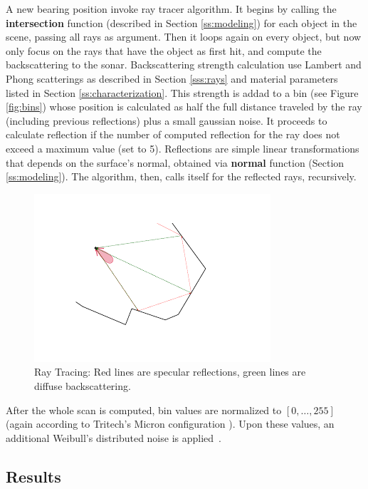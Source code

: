 A new bearing position invoke ray tracer algorithm. It begins by calling
the \textbf{intersection} function (described in Section \ref{ss:modeling}) for
each object in the scene, passing all rays as argument. Then it loops again on every
object, but now only focus on the rays that have the object as first hit, and
compute the backscattering to the sonar. Backscattering strength calculation use
Lambert and Phong scatterings as described in Section \ref{sss:rays} and material
parameters listed in Section \ref{ss:characterization}. This strength is addad
to a bin (see Figure \ref{fig:bins}) whose position is calculated as half the full
distance traveled by the ray (including previous reflections) plus a small
gaussian noise. It proceeds to calculate reflection if the number of computed
reflection for the ray does not exceed a maximum value (set to 5). Reflections
are simple linear transformations that depends on the surface's normal, obtained
via \textbf{normal} function (Section \ref{ss:modeling}). The algorithm, then,
calls itself for the reflected rays, recursively.

\begin{figure}
	\centering
	\includegraphics[scale=2.5, trim={20 20 20 20}, clip]{Chap2/fig/method.pdf}
	\caption{Ray Tracing: Red lines are specular reflections, green lines are diffuse backscattering.}
	\label{fig:methodtrace}
\end{figure}

After the whole scan is computed, bin values are normalized to $[0,\ldots,255]$
(again according to Tritech's Micron configuration ). Upon these values, an
additional Weibull's distributed noise is applied~\cite{maussang2007mean}.

\subsection{Results}
\label{ss:results}

